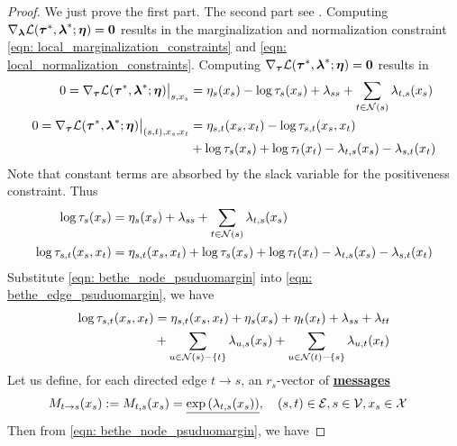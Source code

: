 \documentclass[11pt]{article}
\begin{document}
\begin{proof} We just prove the first part. The second part see \citep{wainwright2008graphical}. Computing $\nabla_{\boldsymbol{\lambda}}{{\mathcal L}(\boldsymbol{\tau}^{*}, \boldsymbol{\lambda}^{*}; \boldsymbol{\eta})} = \boldsymbol{0}$ results in the marginalization and normalization constraint \eqref{eqn: local_marginalization_constraints} and \eqref{eqn: local_normalization_constraints}. 
Computing $\nabla_{\boldsymbol{\tau}}{{\mathcal L}(\boldsymbol{\tau}^{*}, \boldsymbol{\lambda}^{*}; \boldsymbol{\eta})} = \boldsymbol{0}$ results in 
\begin{align*}
0=\nabla_{\boldsymbol{\tau}}{{\mathcal L}(\boldsymbol{\tau}^{*}, \boldsymbol{\lambda}^{*}; \boldsymbol{\eta})}\big|_{s, x_s} &= \eta_{s}(x_{s}) - \log \tau_{s}(x_{s}) + \lambda_{ss}+ \sum_{t \in {\mathcal N}(s)}\lambda_{t,s}(x_s) \\
0=\nabla_{\boldsymbol{\tau}}{{\mathcal L}(\boldsymbol{\tau}^{*}, \boldsymbol{\lambda}^{*}; \boldsymbol{\eta})}\big|_{(s,t), x_s, x_t} &= \eta_{s,t}(x_{s}, x_{t}) - \log \tau_{s,t}(x_s, x_t)  \\
&+ \log\tau_{s}(x_{s}) +  \log\tau_{t}(x_{t})- \lambda_{t,s}(x_s) - \lambda_{s,t}(x_t)
\end{align*} Note  that constant terms are absorbed by the slack variable for the positiveness constraint.
Thus
\begin{align}
\log \tau_{s}(x_{s}) &=  \eta_{s}(x_{s}) + \lambda_{ss}+ \sum_{t \in {\mathcal N}(s)}\lambda_{t,s}(x_s) \label{eqn: bethe_node_psuduomargin} \\
 \log \tau_{s,t}(x_s, x_t)  &=  \eta_{s,t}(x_{s}, x_{t}) + \log\tau_{s}(x_{s}) +  \log\tau_{t}(x_{t})  - \lambda_{t,s}(x_s) - \lambda_{s,t}(x_t)  \label{eqn: bethe_edge_psuduomargin} 
\end{align} Substitute \eqref{eqn: bethe_node_psuduomargin} into \eqref{eqn: bethe_edge_psuduomargin}, we have
\begin{align}
\log \tau_{s,t}(x_s, x_t)  &=  \eta_{s,t}(x_{s}, x_{t}) +  \eta_{s}(x_{s})+ \eta_{t}(x_{t}) + \lambda_{ss}+ \lambda_{tt} \nonumber\\
&+  \sum_{u \in {\mathcal N}(s) - \{t\}}\lambda_{u,s}(x_s) + \sum_{u \in {\mathcal N}(t) - \{s\}}\lambda_{u,t}(x_t)      \label{eqn: bethe_edge_psuduomargin2}
\end{align} Let us define, for each directed edge $t \rightarrow s$, an $r_s$-vector of \underline{\textbf{messages}}
\begin{align}
M_{t \rightarrow s}(x_s) := M_{t,s}(x_s) &=\underline{\exp\left( \lambda_{t,s}(x_{s})\right)}, \quad (s,t) \in {\mathcal E}, s\in {\mathcal V}, x_s \in {\mathcal X}   \label{eqn: bethe_message}
\end{align}
Then from \eqref{eqn: bethe_node_psuduomargin}, we have

\end{proof}
\end{document}
